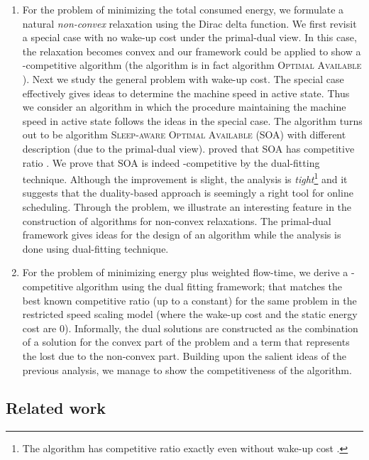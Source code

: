 \documentclass[11pt]{article}
\begin{document}
\begin{enumerate}
	\item For the problem of minimizing the total consumed energy,
	we formulate a natural \emph{non-convex} relaxation using the Dirac delta function. 
	We first revisit a special case with no wake-up cost under the primal-dual view. In this case,
	the relaxation becomes convex and our framework could be applied to show a
	-competitive algorithm (the algorithm is in fact algorithm 
	\textsc{Optimal Available} \cite{YaoDemers95:A-Scheduling-Model}).
	Next we study the general problem with wake-up cost. 
	The special case effectively gives ideas to determine the machine speed in active state. 
	Thus we consider an algorithm in which the procedure maintaining the machine 
	speed in active state follows the ideas in the special case. The algorithm turns out to be algorithm 
	\textsc{Sleep-aware Optimal Available} (SOA) \cite{HanLam10:Deadline-scheduling} with different description 
	(due to the primal-dual view). \citet{HanLam10:Deadline-scheduling} proved that SOA has competitive ratio 
	. We prove that SOA is indeed  
	-competitive by the dual-fitting technique.
	Although the improvement is slight, the analysis is 
	\emph{tight}\footnote{The algorithm has competitive ratio exactly 
	even without wake-up cost \cite{BansalKimbrel07:Speed-scaling}.}
	and it suggests that the duality-based approach is seemingly a right tool for online scheduling. 
	Through the problem, we illustrate an interesting feature in the construction of  
	algorithms for non-convex relaxations. The primal-dual framework
	gives ideas for the design of an algorithm while the analysis is done using dual-fitting technique.     
\item For the problem of minimizing energy plus weighted flow-time, we derive a -competitive
	algorithm using the dual fitting framework; that matches the best known competitive ratio (up to a constant)
	for the same problem in the restricted speed scaling model 
	(where the wake-up cost and the static energy cost are 0). 
	Informally, the dual solutions are constructed as the combination of a solution 
	for the convex part of the problem and a term that represents the lost due to 
	the non-convex part. Building upon the salient ideas of the previous analysis,
	we manage to show the competitiveness of the algorithm. 
\end{enumerate}

\subsection{Related work}
\end{document}
